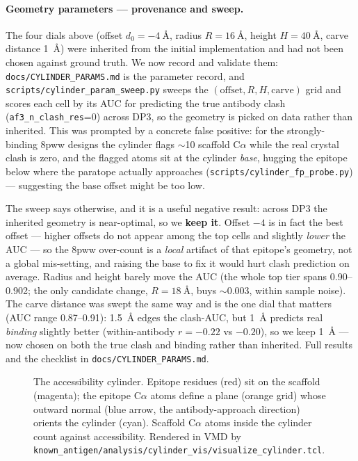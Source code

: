 \paragraph{Geometry parameters --- provenance and sweep.} The four dials above (offset
$d_0=\SI{-4}{\angstrom}$, radius $R=\SI{16}{\angstrom}$, height $H=\SI{40}{\angstrom}$, carve
distance \SI{1}{\angstrom}) were inherited from the initial implementation and had not been
chosen against ground truth. We now record and validate them: \texttt{docs/CYLINDER\_PARAMS.md}
is the parameter record, and \texttt{scripts/cylinder\_param\_sweep.py} sweeps the
$(\text{offset},R,H,\text{carve})$ grid and scores each cell by its AUC for predicting the true
antibody clash (\texttt{af3\_n\_clash\_res}=0) across DP3, so the geometry is picked on data
rather than inherited. This was prompted by a concrete false positive: for the strongly-binding
8pww designs the cylinder flags $\sim$10 scaffold C$\alpha$ while the real crystal clash is zero,
and the flagged atoms sit at the cylinder \emph{base}, hugging the epitope below where the
paratope actually approaches (\texttt{scripts/cylinder\_fp\_probe.py}) --- suggesting the base
offset might be too low.

The sweep says otherwise, and it is a useful negative result: across DP3 the inherited geometry is
near-optimal, so we \textbf{keep it}. Offset $-4$ is in fact the best offset --- higher offsets do
not appear among the top cells and slightly \emph{lower} the AUC --- so the 8pww over-count is a
\emph{local} artifact of that epitope's geometry, not a global mis-setting, and raising the base to
fix it would hurt clash prediction on average. Radius and height barely move the AUC (the whole
top tier spans \num{0.90}--\num{0.902}; the only candidate change, $R=\SI{18}{\angstrom}$, buys
$\sim\!\num{0.003}$, within sample noise). The carve distance was swept the same way and is the one
dial that matters (AUC range \num{0.87}--\num{0.91}): \SI{1.5}{\angstrom} edges the clash-AUC, but
\SI{1}{\angstrom} predicts real \emph{binding} slightly better (within-antibody $r=-0.22$ vs
$-0.20$), so we keep \SI{1}{\angstrom} --- now chosen on both the true clash and binding rather than
inherited. Full results and the checklist in \texttt{docs/CYLINDER\_PARAMS.md}.

\begin{figure}[h]\centering
{}
\caption{The accessibility cylinder. Epitope residues (red) sit on the scaffold (magenta);
the epitope C$\alpha$ atoms define a plane (orange grid) whose outward normal (blue arrow,
the antibody-approach direction) orients the cylinder (cyan). Scaffold C$\alpha$ atoms
inside the cylinder count against accessibility. Rendered in VMD by
\texttt{known\_antigen/analysis/cylinder\_vis/visualize\_cylinder.tcl}.}
\label{fig:cylinder}
\end{figure}

